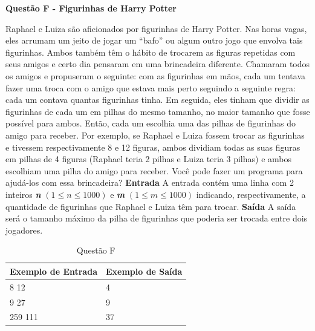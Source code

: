\documentclass[a4paper, 12pt]{article}
\begin{document}
\newpage %
\begin{center}
\textbf{{\Large Questão F - Figurinhas de Harry Potter}}
\end{center}
\vspace{5pt}
Raphael e Luiza são aficionados por figurinhas de Harry Potter. Nas horas vagas, eles arrumam um jeito de jogar um ``bafo'' ou algum outro jogo que envolva tais figurinhas. Ambos também têm o hábito de trocarem as figuras repetidas com seus amigos e certo dia pensaram em uma brincadeira diferente. \newline \newline Chamaram todos os amigos e propuseram o seguinte: com as figurinhas em mãos, cada um tentava fazer uma troca com o amigo que estava mais perto seguindo a seguinte regra: cada um contava quantas figurinhas tinha. Em seguida, eles tinham que dividir as figurinhas de cada um em pilhas do mesmo tamanho, no maior tamanho que fosse possível para ambos. Então, cada um escolhia uma das pilhas de figurinhas do amigo para receber. Por exemplo, se Raphael e Luiza fossem trocar as figurinhas e tivessem respectivamente 8 e 12 figuras, ambos dividiam todas as suas figuras em pilhas de 4 figuras (Raphael teria 2 pilhas e Luiza teria 3 pilhas) e ambos escolhiam uma pilha do amigo para receber. \newline \newline 
Você pode fazer um programa para ajudá-los com essa brincadeira?
\newline \newline
\textbf{{\large Entrada}} \newline
A entrada contém uma linha com 2 inteiros \textbf{\textit{n}} $(1 \leq n \leq 1000)$ e \textbf{\textit{m}} $(1 \leq m \leq 1000)$ indicando, respectivamente, a quantidade de figurinhas que Raphael e Luiza têm para trocar.
\newline \newline
\textbf{{\large Saída}} \newline
A saída será o tamanho máximo da pilha de figurinhas que poderia ser trocada entre dois jogadores.
\newline
\begin{table}[H]
	\centering
	\begin{tabular}{|l|l|}
	\hline
	\textbf{Exemplo de Entrada} & \textbf{Exemplo de Saída} \\ \hline
	8 12 & 4 \\ \hline
	9 27 & 9 \\ \hline
	259 111 & 37 \\ \hline
	\end{tabular}
	\caption{Questão F}
	\label{tabela6}
\end{table}
\end{document}
